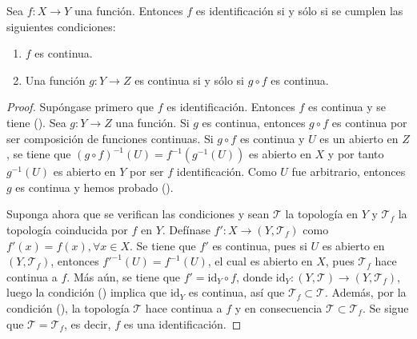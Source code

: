 
\begin{theorem}
Sea $f : X \longrightarrow Y$ una función. Entonces $f$ es identificación si y sólo si se cumplen las siguientes condiciones:
\begin{enumerate}[label=\textnormal{(\roman*)}]
\item $f$ es continua.
\item Una función $g : Y \longrightarrow Z$ es continua si y sólo si $g \circ f$ es continua.
\end{enumerate}
\bigskip

\end{theorem}

\begin{proof}
Supóngase primero que $f$ es identificación. Entonces $f$ es continua y se tiene ({}). Sea $g : Y \longrightarrow Z$ una función. Si $g$ es continua, entonces $g \circ f$ es continua por ser composición de funciones continuas. Si $g \circ f$ es continua y $U$ es un abierto en $Z$, se tiene que $(g \circ f)^{-1}(U) = f^{-1}(g^{-1}(U))$ es abierto en $X$ y por tanto $g^{-1}(U)$ es abierto en $Y$ por ser $f$ identificación. Como $U$ fue arbitrario, entonces $g$ es continua y hemos probado ({}).
\bigskip

Suponga ahora que se verifican las condiciones y sean $\mathcal{T}$ la topología en $Y$ y $\mathcal{T}_f$ la topología coinducida por $f$ en $Y$. Defínase $f' : X \longrightarrow (Y,\mathcal{T}_f)$ como $f'(x) = f(x), \forall x \in X$. Se tiene que $f'$ es continua, pues si $U$ es abierto en $(Y,\mathcal{T}_f)$, entonces $f'^{-1}(U) = f^{-1}(U)$, el cual es abierto en $X$, pues $\mathcal{T}_f$ hace continua a $f$. Más aún, se tiene que $f' = \text{id}_Y \circ f$, donde $\text{id}_Y : (Y,\mathcal{T}) \longrightarrow (Y,\mathcal{T}_f)$, luego la condición ({}) implica que $\text{id}_Y$ es continua, así que $\mathcal{T}_f \subset \mathcal{T}$. Además, por la condición ({}), la topología $\mathcal{T}$ hace continua a $f$ y en consecuencia $\mathcal{T} \subset \mathcal{T}_f$. Se sigue que $\mathcal{T} = \mathcal{T}_f$, es decir, $f$ es una identificación.
\end{proof}
